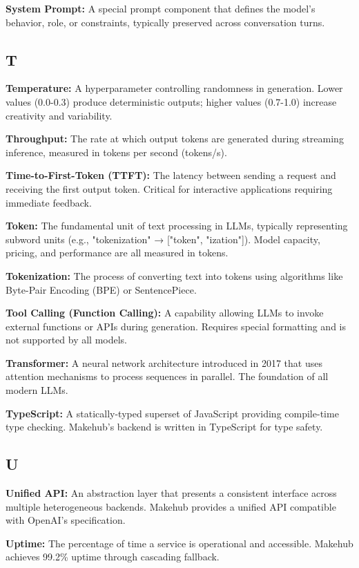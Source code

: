 \documentclass[english]{article}
\begin{document}
\textbf{System Prompt:} A special prompt component that defines the model's behavior, role, or constraints, typically preserved across conversation turns.

\subsection*{T}

\textbf{Temperature:} A hyperparameter controlling randomness in generation. Lower values (0.0-0.3) produce deterministic outputs; higher values (0.7-1.0) increase creativity and variability.

\textbf{Throughput:} The rate at which output tokens are generated during streaming inference, measured in tokens per second (tokens/s).

\textbf{Time-to-First-Token (TTFT):} The latency between sending a request and receiving the first output token. Critical for interactive applications requiring immediate feedback.

\textbf{Token:} The fundamental unit of text processing in LLMs, typically representing subword units (e.g., "tokenization" → ["token", "ization"]). Model capacity, pricing, and performance are all measured in tokens.

\textbf{Tokenization:} The process of converting text into tokens using algorithms like Byte-Pair Encoding (BPE) or SentencePiece.

\textbf{Tool Calling (Function Calling):} A capability allowing LLMs to invoke external functions or APIs during generation. Requires special formatting and is not supported by all models.

\textbf{Transformer:} A neural network architecture introduced in 2017 that uses attention mechanisms to process sequences in parallel. The foundation of all modern LLMs.

\textbf{TypeScript:} A statically-typed superset of JavaScript providing compile-time type checking. Makehub's backend is written in TypeScript for type safety.

\subsection*{U}

\textbf{Unified API:} An abstraction layer that presents a consistent interface across multiple heterogeneous backends. Makehub provides a unified API compatible with OpenAI's specification.

\textbf{Uptime:} The percentage of time a service is operational and accessible. Makehub achieves 99.2\% uptime through cascading fallback.
\end{document}
